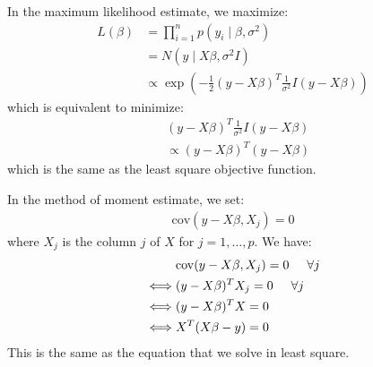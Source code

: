 \documentclass{article}
\begin{document}
In the maximum likelihood estimate, we maximize:
\begin{align*}
L(\beta) &= \prod_{i=1}^n p(y_i \mid \beta, \sigma^2)\\
&=   N(y \mid X\beta, \sigma^2 I)\\
&\propto \exp \left( -\frac{1}{2} (y-X\beta)^T \frac{1}{\sigma^2}I (y-X\beta) \right)
\end{align*}
which is equivalent to minimize:
\begin{align*}
&(y-X\beta)^T \frac{1}{\sigma^2}I (y-X\beta)\\
&\propto (y-X\beta)^T(y-X\beta)
\end{align*}
which is the same as the least square objective function.

In the method of moment estimate, we set:
\begin{align*}
\mathrm{cov}(y - X\beta, X_j) = 0
\end{align*}
where \(X_j\) is the column \(j\) of \(X\) for \(j = 1, \ldots , p\). We have:
\begin{align*}
&\mathrm{cov}(y - X\beta, X_j) = 0 \hspace{0.5cm} \forall j\\
\iff &(y - X\beta)^T X_j = 0 \hspace{0.5cm} \forall j\\
\iff & (y - X\beta)^T X = 0 \\
\iff & X^T(X\beta - y) = 0 \\
\end{align*}
This is the same as the equation that we solve in least square.
\end{document}
